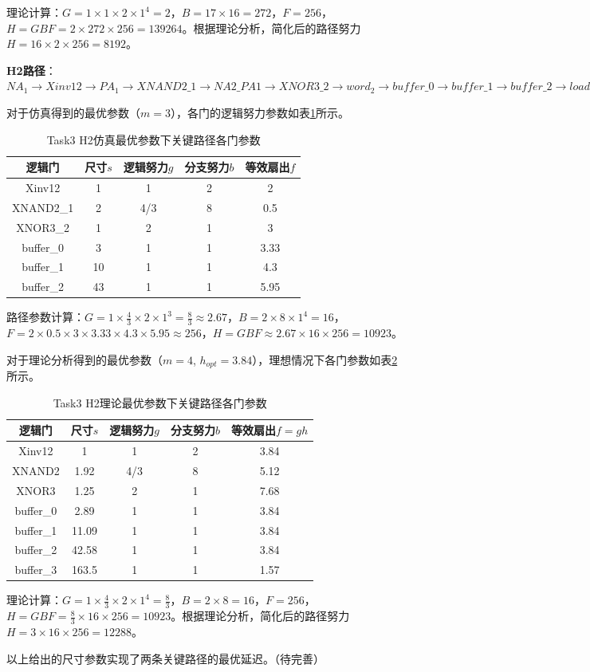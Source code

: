 \documentclass[UTF8,12pt,a4paper]{ctexart}
\begin{document}
理论计算：$G = 1 \times 1 \times 2 \times 1^4 = 2$，$B = 17 \times 16 = 272$，$F = 256$，$H = GBF = 2 \times 272 \times 256 = 139264$。根据理论分析，简化后的路径努力$H = 16 \times 2 \times 256 = 8192$。

\textbf{H2路径}：$NA_1 \rightarrow Xinv12 \rightarrow PA_1 \rightarrow XNAND2\_1 \rightarrow NA2\_PA1 \rightarrow XNOR3\_2 \rightarrow word_2 \rightarrow buffer\_0 \rightarrow buffer\_1 \rightarrow buffer\_2 \rightarrow load$

对于仿真得到的最优参数（$m=3$），各门的逻辑努力参数如表\ref{tab:task3_h2_sim_params}所示。

\begin{table}[htbp]
\centering
\caption{Task3 H2仿真最优参数下关键路径各门参数}
\label{tab:task3_h2_sim_params}
\begin{tabular}{ccccc}
\toprule
逻辑门 & 尺寸$s$ & 逻辑努力$g$ & 分支努力$b$ & 等效扇出$f$ \\
\midrule
Xinv12 & 1 & 1 & 2 & 2 \\
XNAND2\_1 & 2 & 4/3 & 8 & 0.5 \\
XNOR3\_2 & 1 & 2 & 1 & 3 \\
buffer\_0 & 3 & 1 & 1 & 3.33 \\
buffer\_1 & 10 & 1 & 1 & 4.3 \\
buffer\_2 & 43 & 1 & 1 & 5.95 \\
\bottomrule
\end{tabular}
\end{table}

路径参数计算：$G = 1 \times \frac{4}{3} \times 2 \times 1^3 = \frac{8}{3} \approx 2.67$，$B = 2 \times 8 \times 1^4 = 16$，$F = 2 \times 0.5 \times 3 \times 3.33 \times 4.3 \times 5.95 \approx 256$，$H = GBF \approx 2.67 \times 16 \times 256 = 10923$。

对于理论分析得到的最优参数（$m=4$, $h_{opt}=3.84$），理想情况下各门参数如表\ref{tab:task3_h2_theo_params}所示。

\begin{table}[htbp]
\centering
\caption{Task3 H2理论最优参数下关键路径各门参数}
\label{tab:task3_h2_theo_params}
\begin{tabular}{ccccc}
\toprule
逻辑门 & 尺寸$s$ & 逻辑努力$g$ & 分支努力$b$ & 等效扇出$f=gh$ \\
\midrule
Xinv12 & 1 & 1 & 2 & 3.84 \\
XNAND2 & 1.92 & 4/3 & 8 & 5.12 \\
XNOR3 & 1.25 & 2 & 1 & 7.68 \\
buffer\_0 & 2.89 & 1 & 1 & 3.84 \\
buffer\_1 & 11.09 & 1 & 1 & 3.84 \\
buffer\_2 & 42.58 & 1 & 1 & 3.84 \\
buffer\_3 & 163.5 & 1 & 1 & 1.57 \\
\bottomrule
\end{tabular}
\end{table}

理论计算：$G = 1 \times \frac{4}{3} \times 2 \times 1^4 = \frac{8}{3}$，$B = 2 \times 8 = 16$，$F = 256$，$H = GBF = \frac{8}{3} \times 16 \times 256 = 10923$。根据理论分析，简化后的路径努力$H = 3 \times 16 \times 256 = 12288$。

以上给出的尺寸参数实现了两条关键路径的最优延迟。（待完善）
\end{document}
